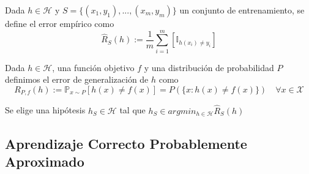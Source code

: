    \begin{frame}
       \begin{definition}
          Dada $h\in \mathcal{H}$ y  ${S=\{(x_1,y_1),...,(x_m,y_m)\}}$ un conjunto de entrenamiento, se define el error empírico como 
                \begin{equation}
                \hat{R}_{S}(h) := \frac{1}{m} \sum_{i=1}^m [\mathbb{I}_{h(x_i) \not= y_i}]
                \end{equation}
       \end{definition}
       
       \pause
       
       \begin{definition}\label{def:errorGeneralizacion}
            Dada $h \in \mathcal{H}$, una función objetivo $f$ y una distribución de probabilidad $P$ definimos el error de generalización de $h$ como
            \begin{equation}
                R_{P,f}(h) := \mathbb{P}_{x \sim P}[h(x) \neq f(x)] = P(\{x: h(x) \neq f(x)\}) \quad \forall x \in \mathcal{X}
            \end{equation}
        \end{definition}
        
        \pause  
        
        \begin{Criterio}
        Se elige una hipótesis $h_S \in \mathcal{H}$ tal que $h_S \in argmin_{h \in \mathcal{H}}\hat{R}_S(h)$
        \end{Criterio}
        
   \end{frame}
   
   
   

\subsection{Aprendizaje Correcto Probablemente Aproximado}

